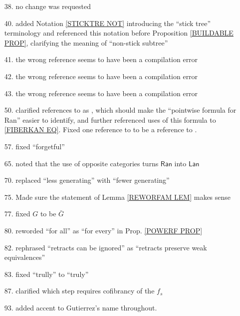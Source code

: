 \documentclass{article}
\begin{document}
\begin{itemize}
\item[38.] no change was requested

\item[40.] added Notation \ref{STICKTRE NOT} introducing the ``stick tree'' terminology and referenced this notation before
Proposition \ref{BUILDABLE PROP},
clarifying the meaning of ``non-stick subtree''

\item[41.] the wrong reference seems to have been a compilation error

\item[42.] the wrong reference seems to have been a compilation error

\item[43.] the wrong reference seems to have been a compilation error

\item[50.] clarified references to \cite[X.3.1]{McL} as \cite[X.3 Thm. 1]{McL}, which should make the ``pointwise formula for Ran'' easier to identify, and further referenced uses of this formula to \eqref{FIBERKAN EQ}.
Fixed one reference to \cite[X.3.1]{McL}
to be a reference to \cite[IX.3]{McL}.


\item[57.] fixed ``forgetful''

\item[65.] noted that the use of opposite categories turns $\mathsf{Ran}$ into $\mathsf{Lan}$

\item[70.] replaced ``less generating'' with ``fewer generating''

\item[75.] Made sure the statement of Lemma \ref{REWORFAM LEM} makes sense

\item[77.] fixed $G$ to be $\bar{G}$

\item[80.] reworded ``for all'' as ``for every'' in Prop. \ref{POWERF PROP}

\item[82.] rephrased ``retracts can be ignored''
as ``retracts preserve weak equivalences''

\item[83.] fixed ``trully'' to ``truly''

\item[87.] clarified which step requires cofibrancy of the 
$f_s$

\item[93.] added accent to Gutierrez's name throughout.


\end{itemize}
\end{document}
